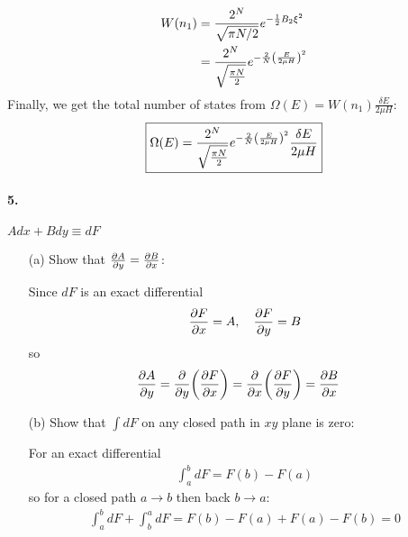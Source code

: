 \documentclass[../main.tex]{subfiles}
\begin{document}
\begin{itemize}
    \begin{align*}
        W(n_1) &= \frac{2^N}{\sqrt{\pi N/2}} e^{-\frac{1}{2} B_2 \xi^2} \\
        &= \frac{2^N}{\sqrt{\frac{\pi N}{2}}} e^{-\frac{2}{N} \qt(\frac{E}{2\mu H})^2}
    \end{align*}
    Finally, we get the total number of states from $\Omega(E) = W(n_1) \frac{\delta E}{2\mu H}$:
    \begin{align*}
        \boxed{
            \Omega(E) = \frac{2^N}{\sqrt{\frac{\pi N}{2}}} e^{-\frac{2}{N} \qt(\frac{E}{2\mu H})^2} \frac{\delta E}{2\mu H}
        }
    \end{align*}
\end{itemize}

\newpage
\paragraph{5.} \( Adx + B dy \equiv dF \)
\begin{itemize}
    \item [(a)] Show that $\pdv{A}{y} = \pdv{B}{x}$:
    
    Since $dF$ is an exact differential 
    \begin{align*}
        \pdv{F}{x} &= A, \quad \pdv{F}{y} = B \\
    \end{align*}
    so
    \begin{align*}
        \pdv{A}{y} &= \pdv{y}(\pdv{F}{x}) = \pdv{x}(\pdv{F}{y}) = \pdv{B}{x}
    \end{align*}
    \item [(b)] Show that $\int dF$ on any closed path in $xy$ plane is zero:
    
    For an exact differential
    \begin{align*}
        \int_a^b dF = F(b) - F(a)
    \end{align*}
    so for a closed path $a \to b$ then back $b \to a$:
    \begin{align*}
        \int_a^b dF + \int_b^a dF = F(b) - F(a) + F(a) - F(b) = 0
    \end{align*}
\end{itemize}

\newpage
\end{document}
